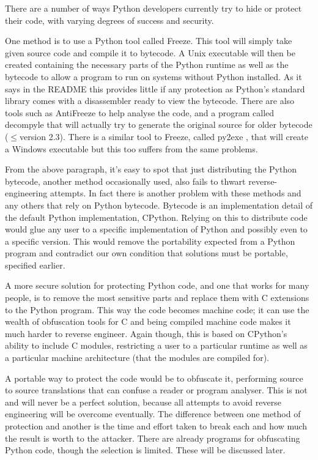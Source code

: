 \documentclass[twoside,a4paper]{report}
\begin{document}
There are a number of ways Python developers currently try to hide or protect their code, with varying degrees
of success and security.

One method is to use a Python tool called Freeze. This tool will simply take given source code and compile
it to bytecode. A Unix executable will then be created containing the necessary parts of the Python runtime as
well as the bytecode to allow a program to run
on systems without Python installed. As it says in the README \cite{freezereadme} this provides little if any
protection as Python's standard library comes with a disassembler ready to view the bytecode. There are also
tools such as AntiFreeze \cite{pirates} to help analyse the code, and a program called
decompyle \cite{decompyle} that will actually try to generate the original source for older bytecode ($\le$version
2.3). There is a similar tool to Freeze, called py2exe \cite{py2exe}, that will create a Windows executable but
this too suffers from the same problems.

From the above paragraph, it's easy to spot that just distributing the Python bytecode, another method occasionally
used, also fails to thwart reverse-engineering attempts. In fact there is another problem
with these methods and any others that rely on Python bytecode. Bytecode is an implementation detail \cite{dis}
of the default Python implementation, CPython. Relying on this to distribute code would glue any
user to a specific implementation of Python and possibly even to a specific version. This would remove the portability
expected from a Python program and contradict our own condition that solutions must be portable, specified earlier.

A more secure solution for protecting Python code, and one that works for many people, is to remove the most
sensitive parts and replace them with C extensions to the Python program. This way the code becomes machine
code; it can use the wealth of obfuscation tools for C and being compiled machine code makes it much
harder to reverse engineer. Again though, this is based on CPython's ability to include C modules, restricting a
user to a particular runtime as well as a particular machine architecture (that the modules are compiled for).

A portable way to protect the code would be to obfuscate it, performing source to source translations that can
confuse a reader or program analyser. This is not and will never be a perfect solution, because all attempts
to avoid reverse engineering will be overcome eventually. The difference between one method of protection and
another is the time and effort taken to break each and how much the result is worth to the attacker. There are already
programs for obfuscating Python code, though the selection is limited. These will be discussed later.
\end{document}
